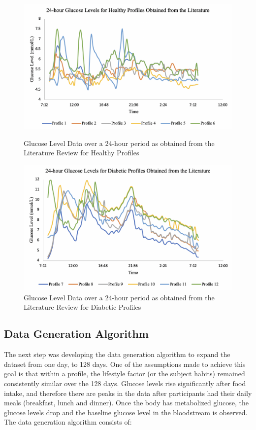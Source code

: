 \begin{center}
\begin{figure}[h!]
	\centering
    \includegraphics[scale=0.5]{Figures/LEEN/fig1.png}
 	\caption{Glucose Level Data over a 24-hour period as obtained from the Literature Review for Healthy Profiles}
  	\label{Figure 2}
  	
	\centering
    \includegraphics[scale=0.5]{Figures/LEEN/fig2.png}
 	\caption{Glucose Level Data over a 24-hour period as obtained from the Literature Review for Diabetic Profiles}
  	\label{Figure 3}
\end{figure}
\end{center}

\subsection{Data Generation Algorithm}
\label{data_generation_algorithm}
The next step was developing the data generation algorithm to expand the dataset from one day, to 128 days. One of the assumptions made to achieve this goal is that within a profile, the lifestyle factor (or the subject habits) remained consistently similar over the 128 days.
Glucose levels rise significantly after food intake, and therefore there are peaks in the data after participants had their daily meals (breakfast, lunch and dinner). Once the body has metabolized glucose, the glucose levels drop and the baseline glucose level in the bloodstream is observed.
\bigbreak
The data generation algorithm consists of:

